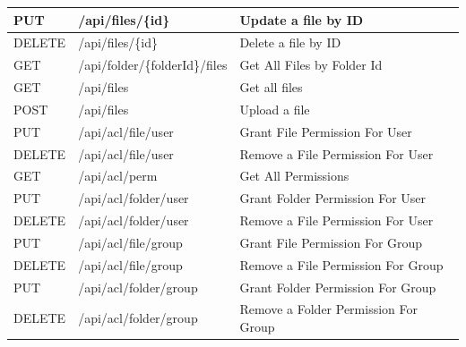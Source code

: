 \begin{longtable}{|p{2cm}|p{5cm}|p{5cm}|}
PUT &
/api/files/\{id\} &
Update a file by ID \\ \hline

DELETE &
/api/files/\{id\} &
Delete a file by ID \\ \hline

GET &
/api/folder/\{folderId\}/files &
Get All Files by Folder Id \\ \hline

GET &
/api/files &
Get all files \\ \hline

POST & 
/api/files &
Upload a file \\ \hline

PUT &
/api/acl/file/user &
Grant File Permission For User \\ \hline

DELETE &
/api/acl/file/user &
Remove a File Permission For User \\ \hline

GET &
/api/acl/perm &
Get All Permissions \\ \hline

PUT &
/api/acl/folder/user &
Grant Folder Permission For User \\ \hline

DELETE &
/api/acl/folder/user &
Remove a File Permission For User \\ \hline

PUT &
/api/acl/file/group &
Grant File Permission For Group \\ \hline

DELETE &
/api/acl/file/group &
Remove a File Permission For Group \\ \hline

PUT &
/api/acl/folder/group &
Grant Folder Permission For Group \\ \hline

DELETE &
/api/acl/folder/group &
Remove a Folder Permission For Group \\ \hline
\end{longtable}

